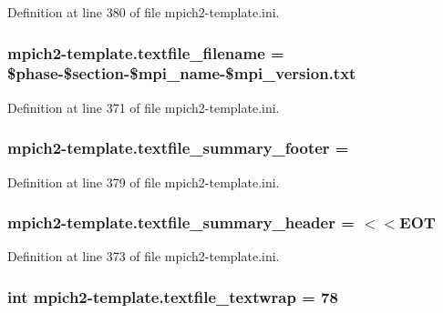 Definition at line 380 of file mpich2-\/template.\-ini.

\hypertarget{namespacempich2-template_a710555fb93fb871c9931af62b3489828}{
\subsubsection[{textfile\-\_\-filename}]{\setlength{\rightskip}{0pt plus 5cm}mpich2-\/template.\-textfile\-\_\-filename = \$phase-\/\$section-\/\$mpi\-\_\-name-\/\$mpi\-\_\-version.\-txt}}\label{namespacempich2-template_a710555fb93fb871c9931af62b3489828}


Definition at line 371 of file mpich2-\/template.\-ini.

\hypertarget{namespacempich2-template_abacd11351989cd5c1a4b3450410d1cd3}{
\subsubsection[{textfile\-\_\-summary\-\_\-footer}]{\setlength{\rightskip}{0pt plus 5cm}mpich2-\/template.\-textfile\-\_\-summary\-\_\-footer =}}\label{namespacempich2-template_abacd11351989cd5c1a4b3450410d1cd3}


Definition at line 379 of file mpich2-\/template.\-ini.

\hypertarget{namespacempich2-template_a6ce48ad896563c19dd5bcd15b12281ed}{
\subsubsection[{textfile\-\_\-summary\-\_\-header}]{\setlength{\rightskip}{0pt plus 5cm}mpich2-\/template.\-textfile\-\_\-summary\-\_\-header = $<$$<$E\-O\-T}}\label{namespacempich2-template_a6ce48ad896563c19dd5bcd15b12281ed}


Definition at line 373 of file mpich2-\/template.\-ini.

\hypertarget{namespacempich2-template_a5eaa982dec46f6f6403987ff0de1e6ae}{
\subsubsection[{textfile\-\_\-textwrap}]{\setlength{\rightskip}{0pt plus 5cm}int mpich2-\/template.\-textfile\-\_\-textwrap = 78}}\label{namespacempich2-template_a5eaa982dec46f6f6403987ff0de1e6ae}



